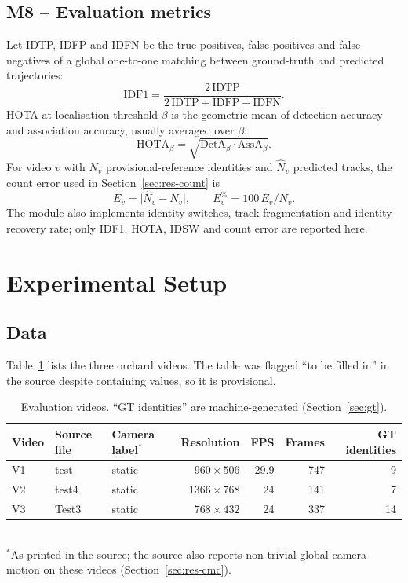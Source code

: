 \documentclass[11pt,a4paper]{article}
\newcommand{\IDF}{\mathrm{IDF1}}
\begin{document}
\subsection{M8 -- Evaluation metrics}
Let IDTP, IDFP and IDFN be the true positives, false positives and false negatives of a global one-to-one matching between ground-truth and predicted trajectories:
\begin{equation}
\IDF=\frac{2\,\mathrm{IDTP}}{2\,\mathrm{IDTP}+\mathrm{IDFP}+\mathrm{IDFN}} .\label{eq:idf1}
\end{equation}
HOTA at localisation threshold $\beta$ is the geometric mean of detection accuracy and association accuracy, usually averaged over $\beta$:
\begin{equation}
\mathrm{HOTA}_\beta=\sqrt{\mathrm{DetA}_\beta\cdot\mathrm{AssA}_\beta} .\label{eq:hota}
\end{equation}
For video $v$ with $N_v$ provisional-reference identities and $\hat N_v$ predicted tracks, the count error used in Section~\ref{sec:res-count} is
\begin{equation}
E_v=\lvert\hat N_v-N_v\rvert,\qquad E^{\%}_v=100\,E_v/N_v .\label{eq:counterr}
\end{equation}
The module also implements identity switches, track fragmentation and identity recovery rate; only IDF1, HOTA, IDSW and count error are reported here.

\section{Experimental Setup}\label{sec:setup}

\subsection{Data}
Table~\ref{tab:videos} lists the three orchard videos. The table was flagged ``to be filled in'' in the source despite containing values, so it is provisional.

\begin{table}[t]
\caption{Evaluation videos. ``GT identities'' are machine-generated (Section~\ref{sec:gt}).}\label{tab:videos}
\centering\small
\begin{tabular}{lllrrrr}
\toprule
Video & Source file & Camera label$^{*}$ & Resolution & FPS & Frames & GT identities\\
\midrule
V1 & test & static & $960\times506$ & 29.9 & 747 & 9\\
V2 & test4 & static & $1366\times768$ & 24 & 141 & 7\\
V3 & Test3 & static & $768\times432$ & 24 & 337 & 14\\
\bottomrule
\end{tabular}\\[2pt]
{\footnotesize $^{*}$As printed in the source; the source also reports non-trivial global camera motion on these videos (Section~\ref{sec:res-cmc}).}
\end{table}
\end{document}
